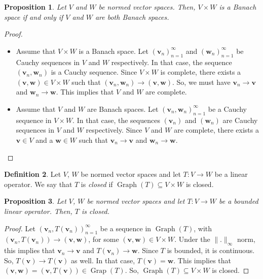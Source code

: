 \documentclass[a4paper, openany]{memoir}
\theoremstyle{definition}
\newtheorem{definition}{Definition}[section]
\theoremstyle{plain}
\newtheorem{proposition}[definition]{Proposition}
\begin{document}
    \begin{proposition}
        Let $V$ and $W$ be normed vector spaces. Then, $V \times W$ is a Banach space if and only if $V$ and $W$ are both Banach spaces.
    \end{proposition}
    \begin{proof}
        \hspace*{0pt}
        \begin{itemize}
            \item Assume that $V \times W$ is a Banach space. Let $(\bm{v}_n)_{n=1}^\infty$ and $(\bm{w}_n)_{n=1}^\infty$ be Cauchy sequences in $V$ and $W$ respectively. In that case, the sequence $(\bm{v}_n, \bm{w}_n)$ is a Cauchy sequence. Since $V \times W$ is complete, there exists a $(\bm{v}, \bm{w}) \in V \times W$ such that $(\bm{v}_n, \bm{w}_n) \to (\bm{v}, \bm{w})$. So, we must have $\bm{v}_n \to \bm{v}$ and $\bm{w}_n \to \bm{w}$. This implies that $V$ and $W$ are complete.
            
            \item Assume that $V$ and $W$ are Banach spaces. Let $(\bm{v}_n, \bm{w}_n)_{n=1}^\infty$ be a Cauchy sequence in $V \times W$. In that case, the sequences $(\bm{v}_n)$ and $(\bm{w}_n)$ are Cauchy sequences in $V$ and $W$ respectively. Since $V$ and $W$ are complete, there exists a $\bm{v} \in V$ and a $\bm{w} \in W$ such that $\bm{v}_n \to \bm{v}$ and $\bm{w}_n \to \bm{w}$.
        \end{itemize}
    \end{proof}

    \begin{definition}
        Let $V$, $W$ be normed vector spaces and let $T: V \to W$ be a linear operator. We say that $T$ is \emph{closed} if $\operatorname{Graph} (T) \subseteq V \times W$ is closed.
    \end{definition}

    \begin{proposition}
        Let $V$, $W$ be normed vector spaces and let $T: V \to W$ be a bounded linear operator. Then, $T$ is closed.
    \end{proposition}
    \begin{proof}
        Let $(\bm{v}_n, T(\bm{v}_n))_{n=1}^\infty$ be a sequence in $\operatorname{Graph} (T)$, with $(\bm{v}_n, T(\bm{v}_n)) \to (\bm{v}, \bm{w})$, for some $(\bm{v}, \bm{w}) \in V \times W$. Under the $\lVert . \rVert_\infty$ norm, this implies that $\bm{v}_n \to \bm{v}$ and $T(\bm{v}_n) \to \bm{w}$. Since $T$ is bounded, it is continuous. So, $T(\bm{v}) \to T(\bm{v})$ as well. In that case, $T(\bm{v}) = \bm{w}$. This implies that $(\bm{v}, \bm{w}) = (\bm{v}, T(\bm{v})) \in \operatorname{Grap} (T)$. So, $\operatorname{Graph} (T) \subseteq V \times W$ is closed.
    \end{proof}
\end{document}
